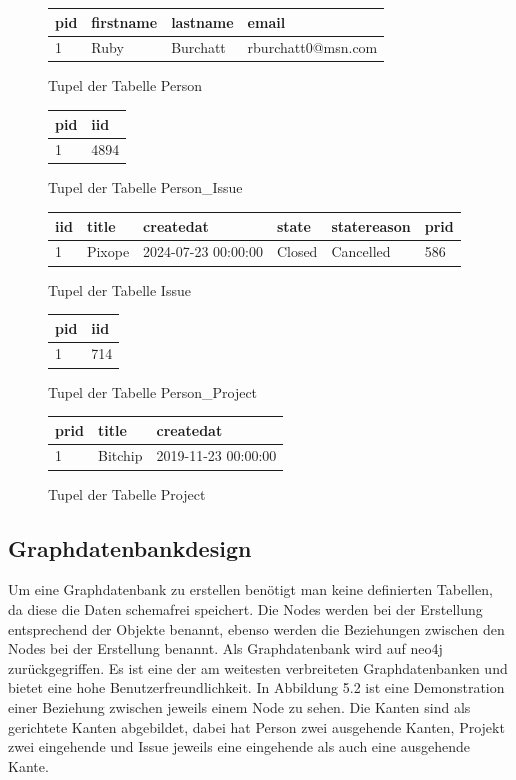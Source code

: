 \begin{figure}[H]
	\centering
	\begin{tabular}{|l | l | l | l |}
	\hline
	pid & firstname & lastname & email \\
	\hline
	1 & Ruby & Burchatt & rburchatt0@msn.com \\
	\hline
	\end{tabular}
	\caption{Tupel der Tabelle Person}
\end{figure}
\begin{figure}[H]
	\centering
	\begin{tabular}{|l | l |}
	\hline
	pid & iid \\
	\hline
	1 & 4894 \\
	\hline
	\end{tabular}
	\caption{Tupel der Tabelle Person\_Issue}
\end{figure}
\begin{figure}[H]
	\centering
	\begin{tabular}{|l | l | l | l | l | l|}
	\hline
	iid & title & createdat & state & statereason & prid \\
	\hline
	1 & Pixope & 2024-07-23 00:00:00 & Closed & Cancelled & 586 \\
	\hline
	\end{tabular}
	\caption{Tupel der Tabelle Issue}
\end{figure}
\begin{figure}[H]
	\centering
	\begin{tabular}{|l | l |}
	\hline
	pid & iid \\
	\hline
	1 & 714 \\
	\hline
	\end{tabular}
	\caption{Tupel der Tabelle Person\_Project}
\end{figure}
\begin{figure}[H]
	\centering
	\begin{tabular}{|l | l | l |}
	\hline
	prid & title & createdat \\
	\hline
	1 & Bitchip & 2019-11-23 00:00:00 \\
	\hline
	\end{tabular}
	\caption{Tupel der Tabelle Project}
\end{figure}


\subsection{Graphdatenbankdesign} %
\label{sec:graphsdatenbankdesign}
Um eine Graphdatenbank zu erstellen benötigt man keine definierten Tabellen, da diese die Daten schemafrei speichert. Die Nodes werden bei der Erstellung entsprechend der Objekte benannt, ebenso werden die Beziehungen zwischen den Nodes bei der Erstellung benannt. Als Graphdatenbank wird auf neo4j zurückgegriffen. Es ist eine der am weitesten verbreiteten Graphdatenbanken und bietet eine hohe Benutzerfreundlichkeit. In Abbildung 5.2 ist eine Demonstration einer Beziehung zwischen jeweils einem Node zu sehen. Die Kanten sind als gerichtete Kanten abgebildet, dabei hat Person zwei ausgehende Kanten, Projekt zwei eingehende und Issue jeweils eine eingehende als auch eine ausgehende Kante. 


